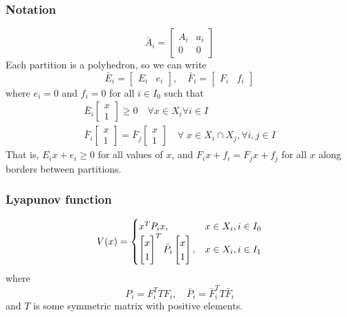 \subsubsection{Notation}
\begin{equation}
  \bar{A}_i = \begin{bmatrix} A_i & a_i \\ 0 & 0 \end{bmatrix}
\end{equation}
%
Each partition is a polyhedron, so we can write
%
\begin{equation}
  \bar{E}_i = \begin{bmatrix} E_i & e_i \end{bmatrix}, \quad
  \bar{F}_i = \begin{bmatrix} F_i & f_i \end{bmatrix}
\end{equation}
%
where $e_i = 0$ and $f_i = 0$ for all $i \in I_0$ such that
%
\begin{gather}
  \bar{E}_i \begin{bmatrix} x \\ 1 \end{bmatrix} \geq 0 \quad \forall x \in X_i \forall i \in I \\
  \bar{F}_i \begin{bmatrix} x \\ 1 \end{bmatrix} = \bar{F}_j \begin{bmatrix} x \\ 1 \end{bmatrix} \quad \forall\; x \in X_i \cap X_j, \forall i, j \in I
\end{gather}
%
That is, $E_i x + e_i \geq 0$ for all values of $x$, and $F_i x + f_i = F_j x + f_j$ for all $x$ along borders between partitions.

\subsubsection{Lyapunov function}
\begin{equation}
  V(x) =
  \begin{cases}
    x^{T} P_i x, &x \in X_i, i \in I_0 \\
    \begin{bmatrix} x\\1 \end{bmatrix}^{T} \bar{P}_i \begin{bmatrix} x\\1 \end{bmatrix}, &x \in X_i, i \in I_1
  \end{cases}
\end{equation}
%
where
%
\begin{equation}\label{eq:pwa-lyapunov-matrix}
    P_i = F_i^T T F_i,\quad \bar{P}_i = \bar{F}_i^T T \bar{F}_i
\end{equation}
%
and $T$ is some symmetric matrix with positive elements.

